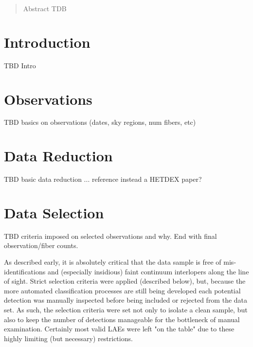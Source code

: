 \documentclass{aastex62}
\begin{document}

\author[0000-0002-8925-9769]{Dustin Davis}


\begin{abstract}

Abstract TDB

\end{abstract}




\section{Introduction} \label{sec:intro}

TBD Intro

\section{Observations} \label{sec:obs}

TBD basics on observations (dates, sky regions, num fibers, etc)

\section{Data Reduction} \label{sec:reduction}

TBD basic data reduction ... reference instead a HETDEX paper?


\section{Data Selection} \label{sec:selection}

TBD criteria imposed on selected observations and why. End with final observation/fiber counts.

As described early, it is absolutely critical that the data sample is free of mis-identifications and (especially insidious) faint continuum interlopers along the line of sight. Strict selection criteria were applied (described below), but, because the more automated classification processes are still being developed each potential detection was manually inspected before being included or rejected from the data set. As such, the selection criteria were set not only to isolate a clean sample, but also to keep the number of detections manageable for the bottleneck of manual examination. Certainly most valid LAEs were left "on the table" due to these highly limiting (but necessary) restrictions. 
\end{document}
